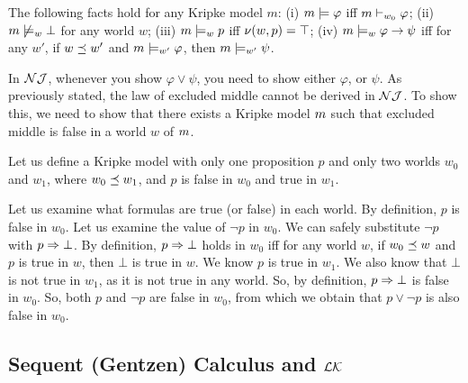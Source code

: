 \begin{theorem}
    The following facts hold for any Kripke
model $m$: (i)  $m \models \varphi$ iff $m \vdash_{w_0} \varphi$;
(ii) $m\not \models_w \bot$ for any world $w$; (iii) $m \models_w p$ iff $\nu(w, p) = \top$; (iv) $m \models_w \varphi \rightarrow \psi$ iff for any $w'$, if $w \preceq w'$ and $m \models_{w'} \varphi$, then $m \models_{w'} \psi$.
\end{theorem}

\begin{remark}
  In $\mathcal{NJ}$, whenever you show $\varphi \lor \psi$, you need to show either
$\varphi$, or $\psi$. As previously stated, the law of excluded middle
cannot be derived in $\mathcal{NJ}$. To show this, we need to show that there
exists a Kripke model $m$ such that excluded middle is false in a
world $w$ of $m$.  
\end{remark}


\begin{example}
Let us define a Kripke model with only one proposition $p$ and only
two worlds $w_0$ and $w_1$, where $w_0 \preceq w_1$, and $p$ is false in
$w_0$ and true in $w_1$.
\begin{center}
\end{center}
Let us examine what formulas are true (or false) in each world. By
definition, $p$ is false in $w_0$. Let us examine the value of
$\neg p$ in $w_0$. We can safely substitute $\neg p$ with $p
\Rightarrow \bot$. By definition, $p \Rightarrow \bot$ holds in
$w_0$ iff for any world $w$, if $w_0 \preceq w$ and $p$ is true in $w$,
then $\bot$ is true in $w$. We know $p$ is true in $w_1$. We also
know that $\bot$ is not true in $w_1$, as it is not true in any world.
So, by definition, $p \Rightarrow \bot$ is false in $w_0$. So, both
$p$ and $\neg p$ are false in $w_0$, from which we obtain that $p
\lor \neg p$ is also false in $w_0$.
\end{example}


\subsection{Sequent (Gentzen) Calculus and $\mathcal{LK}$}

